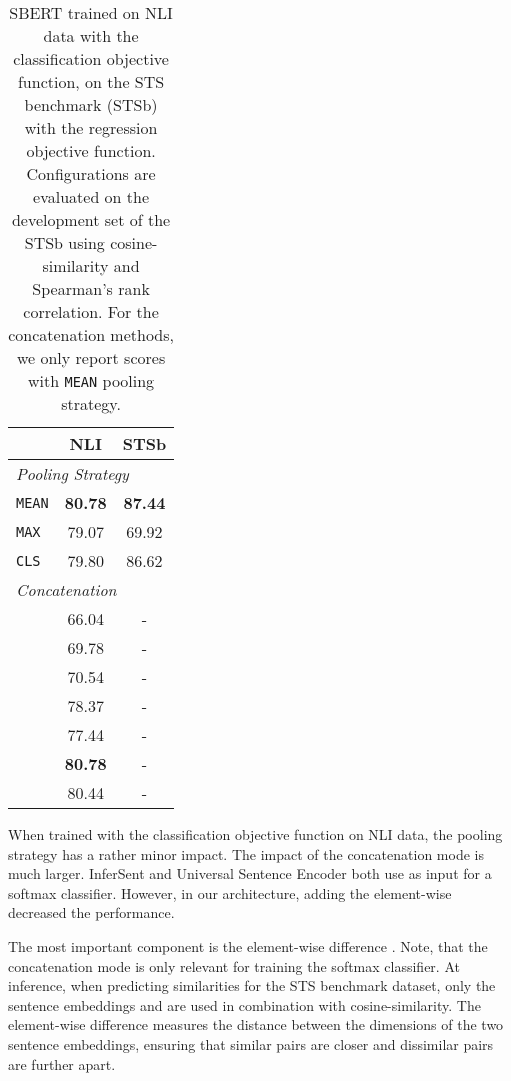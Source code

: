 \documentclass[11pt,a4paper]{article}
\begin{document}
\begin{table}[h]
	\centering 
	\footnotesize
	\begin{tabular}{|l|c|c|}
		\hline
		\textbf{} & \textbf{NLI} & \textbf{STSb} \\ \hline
		\multicolumn{3}{|l|}{\textit{Pooling Strategy}} \\ \hline
		\texttt{MEAN} & \textbf{80.78}   & \textbf{87.44} \\
		\texttt{MAX} & 79.07 & 69.92 \\
		\texttt{CLS} & 79.80 & 86.62  \\		
		\hline
		\multicolumn{3}{|l|}{\textit{Concatenation}} \\ \hline
		 & 66.04 & -\\
		 & 69.78 & - \\
		 & 70.54 & -\\
		 & 78.37  & -\\
		 & 77.44 & -  \\
		 &  \textbf{80.78} & - \\
		 & 80.44 & - \\ 
		\hline	
	\end{tabular}
	\caption{SBERT trained on NLI data with the classification objective function, on the STS benchmark (STSb) with the regression objective function. Configurations are evaluated on the development set of the STSb using cosine-similarity and Spearman's rank correlation. For the concatenation methods, we only report scores with \texttt{MEAN} pooling strategy. }
	\label{table_ablation_sbert_classfication}
\end{table}



When trained with the classification objective function on NLI data, the pooling strategy has a rather minor impact. The impact of the concatenation mode is much larger. InferSent \cite{conneau2017infersent} and Universal Sentence Encoder \cite{universal_sentence_encoder} both use  as input for a softmax classifier. However, in our architecture, adding the element-wise  decreased the performance. 

The most important component is the element-wise difference . Note, that the concatenation mode is only relevant for training the softmax classifier. At inference, when predicting similarities for the STS benchmark dataset, only the sentence embeddings  and  are used in combination with cosine-similarity. The element-wise difference measures the distance between the dimensions of the two sentence embeddings, ensuring that similar pairs are closer and dissimilar pairs are further apart. 
\end{document}
